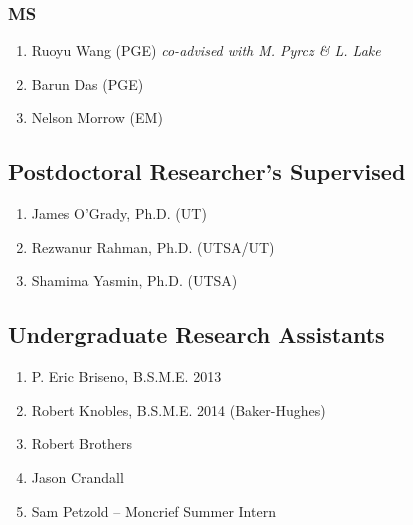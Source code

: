 \subsubsection*{MS}
\begin{enumerate}
    \item Ruoyu Wang (PGE) \emph{co-advised with M. Pyrcz \& L. Lake}
    \item Barun Das (PGE) 
    \item Nelson Morrow (EM) 
\end{enumerate}

\subsection*{Postdoctoral Researcher's Supervised}
  \begin{enumerate}
      \item James O'Grady, Ph.D. (UT)
      \item Rezwanur Rahman, Ph.D. (UTSA/UT)
      \item Shamima Yasmin, Ph.D. (UTSA)
  \end{enumerate}

\subsection*{Undergraduate Research Assistants}
  \begin{enumerate}
    \item P. Eric Briseno, B.S.M.E. 2013
    \item Robert Knobles, B.S.M.E. 2014 (Baker-Hughes)
    \item Robert Brothers
    \item Jason Crandall
    \item Sam Petzold -- Moncrief Summer Intern
  \end{enumerate}


